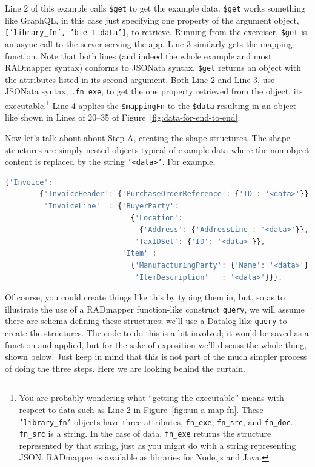 \documentclass[10pt,letterpaper]{article} %
\newcommand{\stt}[1]{\texttt{#1}} %
\begin{document}
Line 2 of this example calls \stt{\$get} to get the example data.
\stt{\$get} works something like GraphQL, in this case just specifying one property of the argument object, \stt{['library\_fn', 'bie-1-data']}, to retrieve.
Running from the exerciser, \stt{\$get} is an async call to the server serving the app.
Line 3 similarly gets the mapping function. Note that both lines (and indeed the whole example and most RADmapper syntax) conforms to JSONata syntax.
\stt{\$get} returns an object with the attributes listed in its second argument.
Both Line 2 and Line 3, use JSONata syntax, \stt{.fn\_exe}, to get the one property retrieved from the object, its executable.\footnote{You are probably wondering what ``getting the executable'' means with respect to  data such as Line 2 in Figure~\ref{fig:run-a-map-fn}.
  These \stt{'library\_fn'} objects have three attributes, \stt{fn\_exe}, \stt{fn\_src}, and \stt{fn\_doc}.
  \stt{fn\_src} is a string.
  In the case of data, \stt{fn\_exe} returns the structure represented by that string, just as you might do with a string representing JSON.
  RADmapper is available as libraries for Node.js and Java.}
Line 4 applies the \stt{\$mappingFn} to the \stt{\$data} resulting in an object like shown in Lines of 20--35 of Figure~\ref{fig:data-for-end-to-end}.

Now let's talk about about Step A, creating the shape structures.
The shape structures are simply nested objects typical of example data where the non-object content is replaced by the string \stt{'<data>'}.
For example,

\begin{lstlisting}[language=JavaScript,numbers=none,basicstyle=\ttfamily\scriptsize]
      {'Invoice':
        {'InvoiceHeader': {'PurchaseOrderReference': {'ID': '<data>'}},
         'InvoiceLine'  : {'BuyerParty':
                             {'Location':
                               {'Address': {'AddressLine': '<data>'}},
                              'TaxIDSet': {'ID': '<data>'}},
                           'Item' :
                             {'ManufacturingParty': {'Name': '<data>'}
                              'ItemDescription'   : '<data>'}}}.
\end{lstlisting} \vspace{-2em}
Of course, you could create things like this by typing them in, but, so as to illustrate the use of a RADmapper function-like construct \stt{query}, we will assume there are schema defining these structures; we'll use a Datalog-like \stt{query} to create the structures. The code to do this is a bit involved; it would be saved as a function and applied, but for the sake of exposition we'll discuss the whole thing, shown below.
Just keep in mind that this is not part of the much simpler process of doing the three steps.
Here we are looking behind the curtain.
\end{document}
